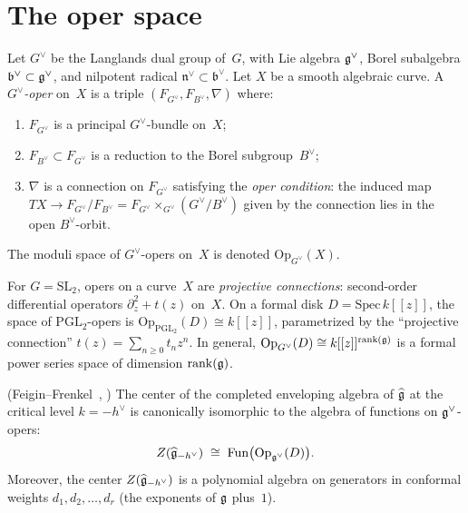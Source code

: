 \section{The oper space}
\label{sec:oper-space}

\begin{definition}
\label{def:opers}
Let $G^\vee$ be the Langlands dual group of~$G$, with
Lie algebra $\mathfrak{g}^\vee$, Borel subalgebra
$\mathfrak{b}^\vee \subset \mathfrak{g}^\vee$, and nilpotent radical
$\mathfrak{n}^\vee \subset \mathfrak{b}^\vee$.  Let $X$ be a smooth algebraic
curve.  A \emph{$G^\vee$-oper} on~$X$ is a triple
$(F_{G^\vee}, F_{B^\vee}, \nabla)$ where:
\begin{enumerate}[label=\textup{(\roman*)}]
\item $F_{G^\vee}$ is a principal $G^\vee$-bundle on~$X$;
\item $F_{B^\vee} \subset F_{G^\vee}$ is a reduction to the Borel
  subgroup~$B^\vee$;
\item $\nabla$ is a connection on $F_{G^\vee}$ satisfying the
  \emph{oper condition}: the induced map
  $TX \to F_{G^\vee}/F_{B^\vee} = F_{G^\vee} \times_{G^\vee} (G^\vee/B^\vee)$
  given by the connection lies in the open $B^\vee$-orbit.
\end{enumerate}
The moduli space of $G^\vee$-opers on~$X$ is denoted
$\mathrm{Op}_{G^\vee}(X)$.
\end{definition}

\begin{example}
\label{ex:sl2-opers}
For $G = \mathrm{SL}_2$, opers on a curve~$X$ are
\emph{projective connections}: second-order differential operators
$\partial_z^2 + t(z)$ on~$X$.  On a formal disk $D = \mathrm{Spec}\, k[[z]]$, the space of
$\mathrm{PGL}_2$-opers is $\mathrm{Op}_{\mathrm{PGL}_2}(D) \cong k[[z]]$,
parametrized by the ``projective connection'' $t(z) = \sum_{n \geq 0} t_n z^n$.
In general, $\mathrm{Op}_{G^\vee}(D) \cong k[[z]]^{\mathrm{rank}(\mathfrak{g})}$
is a formal power series space of dimension $\mathrm{rank}(\mathfrak{g})$.
\end{example}

\begin{theorem}
\label{thm:ff-center-dl}
\textup{(}Feigin--Frenkel~\cite{Feigin-Frenkel},
\cite{FG06}\textup{)}\quad
The center of the completed enveloping algebra of
$\widehat{\mathfrak{g}}$ at the critical level $k = -h^\vee$ is
canonically isomorphic to the algebra of functions on
$\mathfrak{g}^\vee$-opers:
\begin{equation}\label{eq:ff-center}
Z(\widehat{\mathfrak{g}}_{-h^\vee})
\;\cong\;
\mathrm{Fun}\bigl(\mathrm{Op}_{\mathfrak{g}^\vee}(D)\bigr).
\end{equation}
Moreover, the center $Z(\widehat{\mathfrak{g}}_{-h^\vee})$ is a polynomial
algebra on generators in conformal weights
$d_1, d_2, \ldots, d_r$ \textup{(}the exponents of $\mathfrak{g}$
plus~$1$\textup{)}.
\end{theorem}



